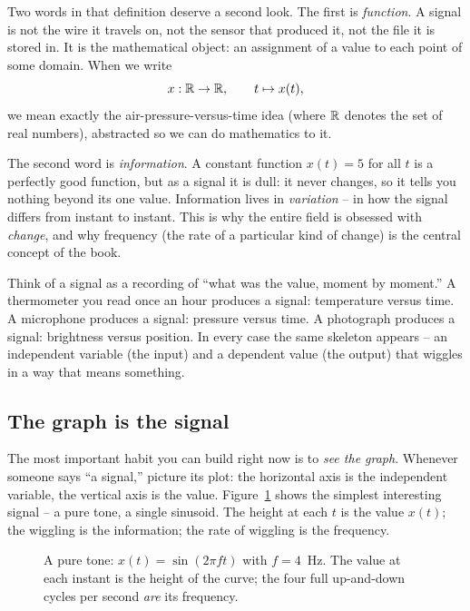 Two words in that definition deserve a second look. The first is \emph{function}. A signal is
not the wire it travels on, not the sensor that produced it, not the file it is stored in. It is
the mathematical object: an assignment of a value to each point of some domain. When we write
\[
  x : \mathbb{R} \to \mathbb{R}, \qquad t \mapsto x(t),
\]
we mean exactly the air-pressure-versus-time idea (where $\mathbb{R}$ denotes the set of real numbers), abstracted so we can do mathematics to it.

The second word is \emph{information}. A constant function $x(t) = 5$ for all $t$ is a perfectly
good function, but as a signal it is dull: it never changes, so it tells you nothing beyond its
one value. Information lives in \emph{variation} -- in how the signal differs from instant to
instant. This is why the entire field is obsessed with \emph{change}, and why frequency (the
rate of a particular kind of change) is the central concept of the book.

\begin{intuitionbox}
Think of a signal as a recording of ``what was the value, moment by moment.'' A thermometer you
read once an hour produces a signal: temperature versus time. A microphone produces a signal:
pressure versus time. A photograph produces a signal: brightness versus position. In every case
the same skeleton appears -- an independent variable (the input) and a dependent value (the
output) that wiggles in a way that means something.
\end{intuitionbox}

\subsection*{The graph is the signal}
The most important habit you can build right now is to \emph{see the graph}. Whenever someone
says ``a signal,'' picture its plot: the horizontal axis is the independent variable, the vertical
axis is the value. Figure~\ref{ch01:fig-tone} shows the simplest interesting signal -- a pure
tone, a single sinusoid. The height at each $t$ is the value $x(t)$; the wiggling
is the information; the rate of wiggling is the frequency.

\begin{figure}[H]
\centering
{}
\caption{A pure tone: $x(t)=\sin(2\pi f t)$ with $f=4$~Hz. The value at each instant is the
height of the curve; the four full up-and-down cycles per second \emph{are} its frequency.}
\label{ch01:fig-tone}
\end{figure}

